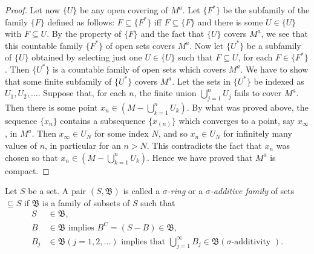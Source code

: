 \begin{proof}
Let now $\{U\}$ be any open covering of $M^a$. Let $\{F^*\}$ be the subfamily of the family $\{F\}$ defined as follows: $F \subseteq \{F^*\}$ iff $F \subseteq \{F\}$ and there is some $U \in \{U\}$ with $F \subseteq U$. By the property of $\{F\}$ and the fact that $\{U\}$ covers $M^a$, we see that this countable family $\{F^*\}$ of open sets covers $M^a$. Now let $\{U^*\}$ be a subfamily of $\{U\}$ obtained by selecting just one $U \in \{U\}$ such that $F \subseteq U$, for each $F \in \{F^*\}$. Then $\{U^*\}$ is a countable family of open sets which covers $M^a$. We have to show that some finite subfamily of $\{U^*\}$ covers $M^a$. Let the sets in $\{U^*\}$ be indexed as $U_1, U_2, \ldots$. Suppose that, for each $n$, the finite union $\bigcup\limits_{j=1}^{n} U_j$ fails to cover $M^a$. Then there is some point $x_n \in \left(M- \bigcup\limits_{k=1}^{n} U_k\right)$. By what was proved above, the sequence $\{x_{n}\}$ contains a subsequence $\{x_{(n)}\}$ which converges to a point, say $x_{\infty}$, in $M^{a}$. Then $x_{\infty} \in U_{N}$ for some index $N$, and so $x_{n} \in U_{N}$ for infinitely many values of $n$, in particular for an $n > N$. This contradicts the fact that $x_{n}$ was chosen so that $x_{n} \in \left(M- \bigcup\limits_{k=1}^{n} U_{k}\right)$. Hence we have proved that $M^{a}$ is compact. 
\end{proof}


\label{sec:0.3}


\begin{definitionu} Let $S$ be a set. A pair $(S, \mathfrak{B})$ is called a \emph{$\sigma$-ring} or a \emph{$\sigma$-additive family} of sets $\subseteq S$ if $\mathfrak{B}$ is a family of subsets of $S$ such that 
\begin{align}
S& \in \mathfrak{B}, \label{eq:0.3.1} \\
B& \in \mathfrak{B} \text{ implies } B ^{C} = (S- B) \in \mathfrak{B}, \label{eq:0.3.2} \\
B_{j}& \in \mathfrak{B} (j = 1, 2, \dots) \text{ implies that } \bigcup\limits_{j=1} ^{\infty} B_{j} \in \mathfrak{B} (\sigma \text{-additivity }). \label{eq:0.3.3}
\end{align}
\end{definitionu}

